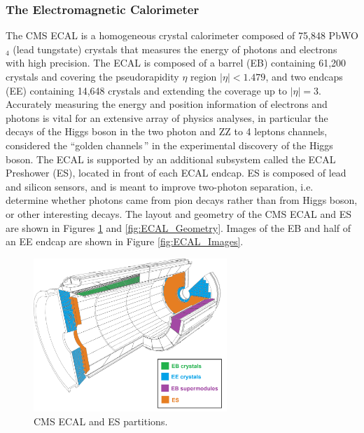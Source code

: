 
\subsubsection{The Electromagnetic Calorimeter}\label{sec:ECAL}

The CMS ECAL is a homogeneous crystal calorimeter composed of 75,848 PbWO$_{4}$ (lead tungstate) crystals that measures the energy of photons and electrons with high precision. The ECAL is composed of a barrel (EB) containing 61,200 crystals and covering the pseudorapidity $\eta$ region $|\eta| < 1.479$, and two endcaps (EE) containing 14,648 crystals and extending the coverage up to $|\eta| = 3$. Accurately measuring the energy and position information of electrons and photons is vital for an extensive array of physics analyses, in particular the decays of the Higgs boson in the two photon and ZZ to 4 leptons channels, considered the ``golden channels\,'' in the experimental discovery of the Higgs boson. The ECAL is supported by an additional subsystem called the ECAL Preshower (ES), located in front of each ECAL endcap. ES is composed of lead and silicon sensors, and is meant to improve two-photon separation, i.e. determine whether photons came from pion decays rather than from Higgs boson, or other interesting decays. The layout and geometry of the CMS ECAL and ES are shown in Figures \ref{fig:ECAL_Partitions} and \ref{fig:ECAL_Geometry}. Images of the EB and half of an EE endcap are shown in Figure \ref{fig:ECAL_Images}. 

\begin{figure}[H]
    \centering
    \includegraphics[width=0.65\textwidth]{Images/ECAL/Introduction/ECAL_ES_Diagram_colored.png}    
    \caption{CMS ECAL and ES partitions.}
    \label{fig:ECAL_Partitions}
\end{figure}

